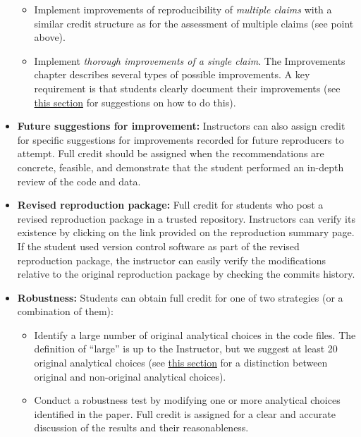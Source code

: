 \documentclass[
]{book}
\providecommand{\tightlist}{%
  \setlength{\itemsep}{0pt}\setlength{\parskip}{0pt}}
\begin{document}
\begin{itemize}
  \begin{itemize}
  \tightlist
  \item
    Implement improvements of reproducibility of \emph{multiple claims} with a similar credit structure as for the assessment of multiple claims (see point above).\\
  \item
    Implement \emph{thorough improvements of a single claim}. The Improvements chapter describes several types of possible improvements. A key requirement is that students clearly document their improvements (see \href{https://bitss.github.io/ACRE/improvements.html\#doc-impr}{this section} for suggestions on how to do this).\\
  \end{itemize}
\item
  \textbf{Future suggestions for improvement:} Instructors can also assign credit for specific suggestions for improvements recorded for future reproducers to attempt. Full credit should be assigned when the recommendations are concrete, feasible, and demonstrate that the student performed an in-depth review of the code and data.\\
\item
  \textbf{Revised reproduction package:} Full credit for students who post a revised reproduction package in a trusted repository. Instructors can verify its existence by clicking on the link provided on the reproduction summary page. If the student used version control software as part of the revised reproduction package, the instructor can easily verify the modifications relative to the original reproduction package by checking the commits history.\\
\item
  \textbf{Robustness:} Students can obtain full credit for one of two strategies (or a combination of them):

  \begin{itemize}
  \tightlist
  \item
    Identify a large number of original analytical choices in the code files. The definition of ``large'' is up to the Instructor, but we suggest at least 20 original analytical choices (see \href{https://bitss.github.io/ACRE/robust.html\#robust}{this section} for a distinction between original and non-original analytical choices).\\
  \item
    Conduct a robustness test by modifying one or more analytical choices identified in the paper. Full credit is assigned for a clear and accurate discussion of the results and their reasonableness.
  \end{itemize}
\end{itemize}
\end{document}
